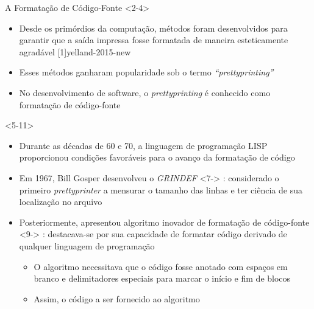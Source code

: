 \documentclass
  [ aspectratio=169,
    english,
    hyperref={citecolor=blue,colorlinks=true,linkcolor=blue,urlcolor=blue},
    brazil]
  {beamer}
\begin{document}
  \begin{frame}{A Formatação de Código-Fonte}
    \only
      <2-4>
      { \begin{itemize}
          \item<2-> Desde os primórdios da computação, métodos foram
                    desenvolvidos para garantir que a saída impressa fosse
                    formatada de maneira esteticamente agradável
                    [1]{yelland-2015-new}
          \item<3-> Esses métodos ganharam popularidade sob o termo
                    \textit{``prettyprinting''}
          \item<4-> No desenvolvimento de software, o \textit{prettyprinting} é
                    conhecido como formatação de código-fonte
        \end{itemize}}%
    \only
      <5-11>
      { \begin{itemize}
          \item<5-> Durante as décadas de 60 e 70, a linguagem de programação
                    LISP proporcionou condições favoráveis para o avanço da
                    formatação de código \cite[2]{yelland-2015-new}
          \item<6-> Em 1967, Bill Gosper desenvolveu o \textit{GRINDEF}%
                    \onslide
                      <7->
                      {%
                        : considerado o primeiro \textit{prettyprinter} a
                        mensurar o tamanho das linhas e ter ciência de sua
                        localização no arquivo
                        \cites
                          {gosper-2023-twubblesome}
                          {griesemer-2022-cultural}}
          \item<8-> Posteriormente, \textcite{oppen-1980-prettyprinting}
                    apresentou algoritmo inovador de formatação de
                    código-fonte%
                    \onslide
                      <9->
                      {%
                        : destacava-se por sua capacidade de formatar código
                        derivado de qualquer linguagem de programação}
                    \begin{itemize}
                      \item<10->  O algoritmo necessitava que o código fosse
                                  anotado com espaços em branco e delimitadores
                                  especiais para marcar o início e fim de
                                  blocos
                      \item<11->  Assim, o código a ser fornecido ao algoritmo

\end{itemize}
\end{itemize}}
\end{frame}
\end{document}
